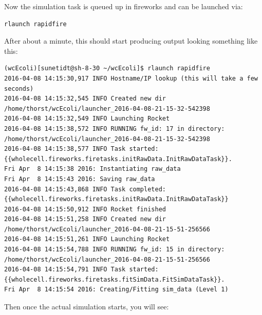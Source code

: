 \documentclass[12pt]{article}
\begin{document}
Now the simulation task is queued up in fireworks and can be launched via:

\begin{lstlisting}
rlaunch rapidfire
\end{lstlisting}

After about a minute, this should start producing output looking something like this:

\begin{lstlisting}
(wcEcoli)[sunetidt@sh-8-30 ~/wcEcoli]$ rlaunch rapidfire
2016-04-08 14:15:30,917 INFO Hostname/IP lookup (this will take a few seconds)
2016-04-08 14:15:32,545 INFO Created new dir /home/thorst/wcEcoli/launcher_2016-04-08-21-15-32-542398
2016-04-08 14:15:32,549 INFO Launching Rocket
2016-04-08 14:15:38,572 INFO RUNNING fw_id: 17 in directory: /home/thorst/wcEcoli/launcher_2016-04-08-21-15-32-542398
2016-04-08 14:15:38,577 INFO Task started: {{wholecell.fireworks.firetasks.initRawData.InitRawDataTask}}.
Fri Apr  8 14:15:38 2016: Instantiating raw_data
Fri Apr  8 14:15:43 2016: Saving raw_data
2016-04-08 14:15:43,868 INFO Task completed: {{wholecell.fireworks.firetasks.initRawData.InitRawDataTask}} 
2016-04-08 14:15:50,912 INFO Rocket finished
2016-04-08 14:15:51,258 INFO Created new dir /home/thorst/wcEcoli/launcher_2016-04-08-21-15-51-256566
2016-04-08 14:15:51,261 INFO Launching Rocket
2016-04-08 14:15:54,788 INFO RUNNING fw_id: 15 in directory: /home/thorst/wcEcoli/launcher_2016-04-08-21-15-51-256566
2016-04-08 14:15:54,791 INFO Task started: {{wholecell.fireworks.firetasks.fitSimData.FitSimDataTask}}.
Fri Apr  8 14:15:54 2016: Creating/Fitting sim_data (Level 1)
 \end{lstlisting}

\hfill \break

Then once the actual simulation starts, you will see:

\hfill \break
\end{document}
